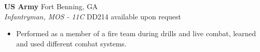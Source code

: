 \vspace{0.75em}

\noindent
\textbf{US Army} \hfill Fort Benning, GA \\
\textit{Infantryman, MOS - 11C} \hfill DD214 available upon request \\
\begin{itemize}[leftmargin=*,noitemsep,topsep=3pt]
    \item Performed as a member of a fire team during drills and live combat, learned and used different combat systems.
\end{itemize}